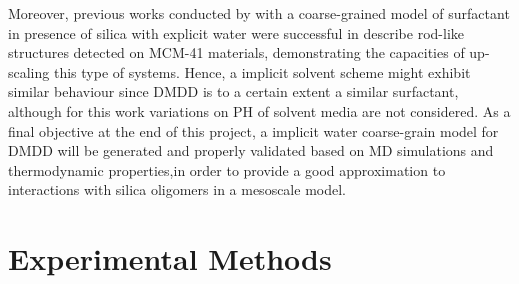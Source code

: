 \documentclass[10pt,a4paper,twoside]{article}
\begin{document}
Moreover, previous works conducted by \cite{mjsilica} with a coarse-grained model of surfactant in presence of silica with explicit water were successful in describe rod-like structures detected on MCM-41 materials, demonstrating the capacities of up-scaling this type of systems. Hence, a implicit solvent scheme might exhibit similar behaviour since DMDD is to a certain extent a similar surfactant, although for this work variations on PH of solvent media are not considered. As a final objective at the end of this project, a implicit water coarse-grain model for DMDD will be generated and properly validated based on MD simulations and thermodynamic properties,in order to provide a good approximation to interactions with silica oligomers in a mesoscale model.



\section{Experimental Methods}
\end{document}
